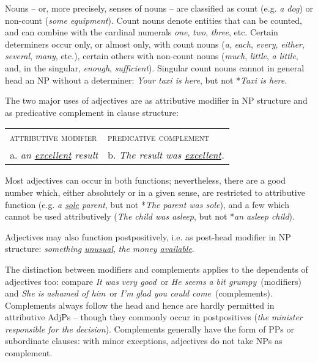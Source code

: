 \newpage

Nouns -- or, more precisely, senses of nouns -- are classified as {count} (e.g. \textit{a dog}) or {non-count} (\textit{some equipment}). Count nouns denote entities that can be counted, and can combine with the cardinal numerals \textit{one}, \textit{two}, \textit{three}, etc. Certain determiners occur only, or almost only, with count nouns (\textit{a}, \textit{each}, \textit{every}, \textit{either}, \textit{several}, \textit{many}, etc.), certain others with non-count nouns (\textit{much}, \textit{little}, \textit{a little}, and, in the singular, \textit{enough}, \textit{sufficient}). Singular count nouns cannot in general head an NP without a determiner: \textit{Your taxi is here}, but not *\textit{Taxi is here}.


The two major uses of adjectives are as attributive modifier in NP structure and as predicative complement in clause structure:
\begin{examples}
\item \label{ex:26}
    \begin{tabular}{ll}
        \hspace{1em}\textsc{attributive modifier} & \hspace{1em}\textsc{predicative complement}\\
        a. \textit{an \uline{excellent} result} & b. \textit{The result was \uline{excellent}.}
    \end{tabular}
\end{examples}
Most adjectives can occur in both functions; nevertheless, there are a good number which, either absolutely or in a given sense, are restricted to attributive function (e.g. \textit{a \uline{sole} parent}, but not *\textit{The parent was sole}), and a few which cannot be used attributively (\textit{The child was asleep}, but not *\textit{an asleep child}).

Adjectives may also function postpositively, i.e. as post-head modifier in NP structure: \textit{something \uline{unusual}}, \textit{the money \uline{available}}.

The distinction between modifiers and complements applies to the dependents of adjectives too: compare \textit{It was} \ob\textit{very good}\cb\ or \textit{He seems} \ob\textit{a bit grumpy}\cb\ (modifiers) and \textit{She is} \ob\textit{ashamed of him}\cb\ or \textit{I'm} \ob\textit{glad you could come}\cb\ (complements). Complements always follow the head and hence are hardly permitted in attributive AdjPs -- though they commonly occur in postpositives (\textit{the minister} \ob\textit{responsible for the decision}\cb). Complements generally have the form of PPs or subordinate clauses: with minor exceptions, adjectives do not take NPs as complement.

